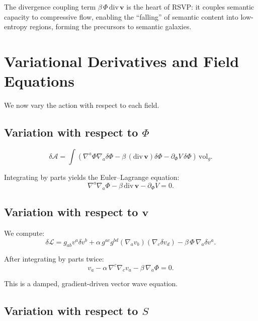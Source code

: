 \begin{remark}
The divergence coupling term $\beta \,\Phi\, \mathrm{div}\,\mathbf{v}$ is the heart of RSVP: it couples semantic capacity to compressive flow, enabling the ``falling'' of semantic content into low-entropy regions, forming the precursors to semantic galaxies.
\end{remark}

\section{Variational Derivatives and Field Equations}

We now vary the action with respect to each field.

\subsection{Variation with respect to $\Phi$}

\[
\delta \mathcal{A} = \int (\nabla^a \Phi \nabla_a \delta \Phi - \beta \, (\mathrm{div}\,\mathbf{v})\delta\Phi - \partial_\Phi V\, \delta\Phi)\,\mathrm{vol}_g.
\]

Integrating by parts yields the Euler--Lagrange equation:
\begin{equation}
\label{eq:phi-eom}
\nabla^a \nabla_a \Phi - \beta\, \mathrm{div}\,\mathbf{v} - \partial_\Phi V = 0.
\end{equation}

\subsection{Variation with respect to $\mathbf{v}$}

We compute:
\[
\delta \mathcal{L} = g_{ab} v^a \delta v^b
 + \alpha\, g^{ac} g^{bd} (\nabla_a v_b)(\nabla_c \delta v_d)
 - \beta\, \Phi\, \nabla_a \delta v^a.
\]

After integrating by parts twice:
\begin{equation}
\label{eq:v-eom}
v_a
 - \alpha\, \nabla^c \nabla_c v_a
 - \beta\, \nabla_a \Phi
 = 0.
\end{equation}

This is a damped, gradient-driven vector wave equation.

\subsection{Variation with respect to $S$}

